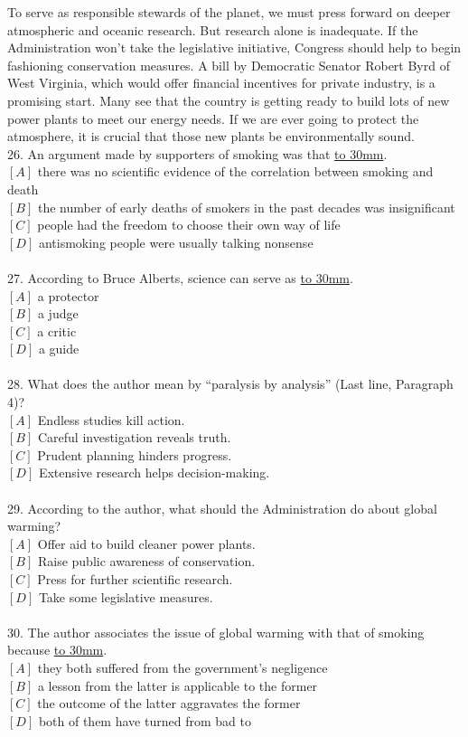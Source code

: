 \documentclass[a4paper]{article}
\begin{document}
\par
To serve as responsible stewards of the planet, we must press forward on deeper atmospheric and oceanic research. But research alone is inadequate. If the Administration won’t take the legislative initiative, Congress should help to begin fashioning conservation measures. A bill by Democratic Senator Robert Byrd of West Virginia, which would offer financial incentives for private industry, is a promising start. Many see that the country is getting ready to build lots of new power plants to meet our energy needs. If we are ever going to protect the atmosphere, it is crucial that those new plants be environmentally sound.
\\26.	An argument made by supporters of smoking was that \underline{\hbox to 30mm{}}.\\$[A]$ there was no scientific evidence of the correlation between smoking and death\\$[B]$ the number of early deaths of smokers in the past decades was insignificant\\$[C]$ people had the freedom to choose their own way of life\\$[D]$ antismoking people were usually talking nonsense\\\\27.	According to Bruce Alberts, science can serve as \underline{\hbox to 30mm{}}.\\$[A]$ a protector\\$[B]$ a judge\\$[C]$ a critic\\$[D]$ a guide\\\\28.	What does the author mean by “paralysis by analysis” (Last line, Paragraph 4)?\\$[A]$ Endless studies kill action.\\$[B]$ Careful investigation reveals truth.\\$[C]$ Prudent planning hinders progress.\\$[D]$ Extensive research helps decision-making.\\\\29.	According to the author, what should the Administration do about global warming?\\$[A]$ Offer aid to build cleaner power plants.\\$[B]$ Raise public awareness of conservation.\\$[C]$ Press for further scientific research.\\$[D]$ Take some legislative measures.\\\\30.	The author associates the issue of global warming with that of smoking because \underline{\hbox to 30mm{}}.\\$[A]$ they both suffered from the government’s negligence\\$[B]$ a lesson from the latter is applicable to the former\\$[C]$ the outcome of the latter aggravates the former\\$[D]$ both of them have turned from bad to 
\end{document}
